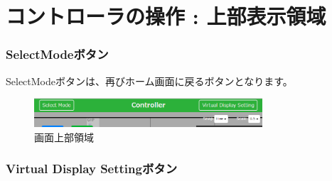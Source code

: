 \documentclass[a4paper,10pt,oneside]{jsbook}
\begin{document}
\clearpage 



\chapter{コントローラの操作 : 上部表示領域}
\subsection{SelectModeボタン}
SelectModeボタンは、再びホーム画面に戻るボタンとなります。

\begin{figure}[htbp]
	\begin{center}
		\includegraphics[width=8.5cm]{image/Upper.PNG}
	\end{center}
	\caption{画面上部領域}
	\label{fig:upperarea}
\end{figure}


\subsection{Virtual Display Settingボタン}
\end{document}
